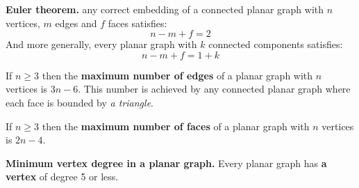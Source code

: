 \textbf{Euler theorem.} any correct embedding of a connected planar graph with $n$ vertices, $m$ edges and $f$ faces satisfies:
$$
n - m + f = 2
$$
And more generally, every planar graph with $k$ connected components satisfies:
$$
n-m+f = 1+k
$$

If $n \ge 3$ then the \textbf{maximum number of edges} of a planar graph with $n$ vertices is
$3n - 6$. 
This number is achieved by any connected planar graph where each face is bounded by \textit{a triangle}. 

If $n \ge 3$ then the \textbf{maximum number of faces} of a planar graph with 
$n$ vertices is $2n - 4$.

\textbf{Minimum vertex degree in a planar graph.}
Every planar graph has \textbf{a vertex} of degree 5 or less.

